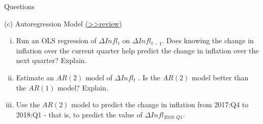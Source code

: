 \documentclass[
  10pt,
  ignorenonframetext,
]{beamer}
\providecommand{\tightlist}{%
  \setlength{\itemsep}{0pt}\setlength{\parskip}{0pt}}
\begin{document}
\begin{frame}{Questions}
\protect\hypertarget{questions-1}{}
\begin{block}{(c) Autoregression Model
\footnotesize\protect\hyperlink{ARmodel}{(\textgreater\textgreater review)}
\normalsize}
\protect\hypertarget{c-autoregression-model-review}{}
\begin{enumerate}
[i.]
\tightlist
\item
  Run an OLS regression of \(\Delta Infl_t\) on \(\Delta Infl_{t-1}\).
  Does knowing the change in inflation over the current quarter help
  predict the change in inflation over the next quarter? Explain.
\end{enumerate}

\vspace{0.8mm}

\begin{enumerate}
[i.]
\setcounter{enumi}{1}
\tightlist
\item
  Estimate an \(AR(2)\) model of \(\Delta Infl_t\) . Is the \(AR(2)\)
  model better than the \(AR(1)\) model? Explain.
\end{enumerate}

\vspace{0.8mm}

\begin{enumerate}
[i.]
\setcounter{enumi}{2}
\tightlist
\item
  Use the \(AR(2)\) model to predict the change in inflation from
  2017:Q4 to 2018:Q1 - that is, to predict the value of
  \(\Delta Infl_{2018:Q1}\).
\end{enumerate}
\end{block}
\end{frame}
\end{document}

